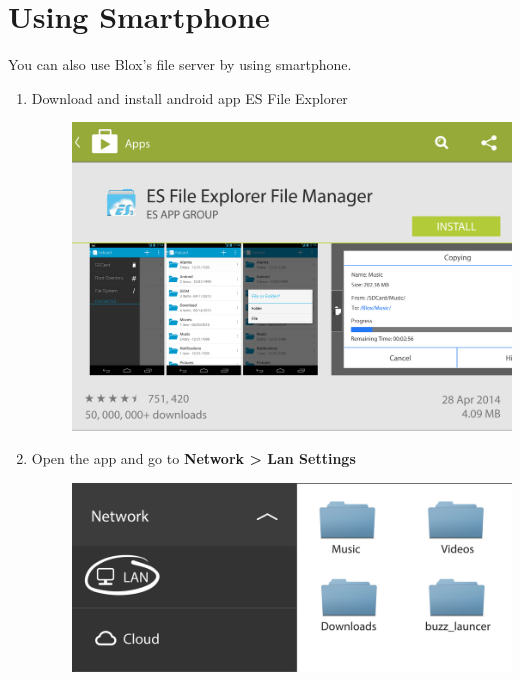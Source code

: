 \documentclass[letterpaper,10pt,english]{sphinxmanual}
\begin{document}
\section{Using Smartphone}
\label{yourfiles:using-smartphone}\label{yourfiles:id3}
You can also use Blox's file server by using smartphone.
\begin{enumerate}
\item {} \begin{description}
\item[{Download and install android app ES File Explorer}] \leavevmode
\includegraphics{esfile-download.jpg}

\end{description}

\item {} \begin{description}
\item[{Open the app and go to \textbf{Network \textgreater{} Lan Settings}}] \leavevmode
\includegraphics{ESFILE-lan.jpg}

\end{description}


\end{enumerate}
\end{document}
